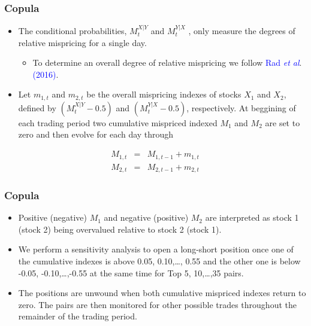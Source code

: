 \documentclass[pdf,9pt,xcolor=dvipsnames,hide notes]{beamer}
\begin{document}
\begin{frame}[label=frame4f2]
	\frametitle{Copula}
	
	\vspace{0.3cm}
	
	\begin{itemize}
		\item The conditional probabilities, $M_{t}^{X\left\vert Y\right. }$ and $%
		M_{t}^{Y\left\vert X\right. }$ , only measure the degrees of relative
		mispricing for a single day. 
		\begin{itemize}
			\item To determine an overall degree of relative
			mispricing we follow \textcolor{blue}{Rad \emph{et al}}. \textcolor{blue}{(2016)}.
		\end{itemize} 
		
		\vspace{0.3cm}
		
		\item Let $m_{1,t}$ and $m_{2,t}$ be the
		overall mispricing indexes of stocks $X_{1}$ and $X_{2}$, defined by $\left(
		M_{t}^{X\left\vert Y\right. }-0.5\right) $ and $\left( M_{t}^{Y\left\vert
			X\right. }-0.5\right) $, respectively. At beggining of each
		trading period two cumulative mispriced indexed $M_{1}$ and $M_{2}$ are set
		to zero and then evolve for each day through%
	\end{itemize}
	
	\begin{eqnarray*}
		M_{1,t} &=&M_{1,t-1}+m_{1,t} \\
		M_{2,t} &=&M_{2,t-1}+m_{2,t}
	\end{eqnarray*}

\end{frame}

\begin{frame}[label=frame4f3]
	\frametitle{Copula}
	
	\vspace{0.3cm}
	
	\begin{itemize}
		\item Positive (negative) $M_{1}$ and negative (positive) $M_{2}$ are interpreted
		as stock 1 (stock 2) being overvalued relative to stock 2 (stock 1).
		
		\vspace{0.3cm}
		
		\item We
		perform a sensitivity analysis to open a long-short position once one of the
		cumulative indexes is above 0.05, 0.10,\ldots, 0.55 and the other one is below
		-0.05, -0.10,\ldots,-0.55 at the same time for Top 5, 10,\ldots,35 pairs.
		
		\vspace{0.3cm}
		
		\item The
		positions are unwound when both cumulative mispriced indexes return to zero.
		The pairs are then monitored for other possible trades throughout the
		remainder of the trading period.
		
	\end{itemize}
\end{frame}
	
\end{document}
